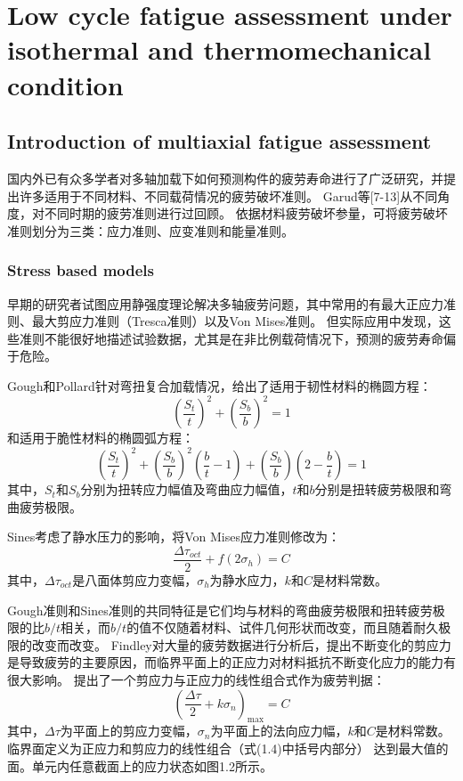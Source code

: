 ﻿\chapter{Low cycle fatigue assessment under isothermal and thermomechanical condition}



\section{Introduction of multiaxial fatigue assessment}
国内外已有众多学者对多轴加载下如何预测构件的疲劳寿命进行了广泛研究，并提出许多适用于不同材料、不同载荷情况的疲劳破坏准则。
Garud等[7-13]从不同角度，对不同时期的疲劳准则进行过回顾。
依据材料疲劳破坏参量，可将疲劳破坏准则划分为三类：应力准则、应变准则和能量准则。
\subsection{Stress based models}
早期的研究者试图应用静强度理论解决多轴疲劳问题，其中常用的有最大正应力准则、最大剪应力准则（Tresca准则）以及Von Mises准则。
但实际应用中发现，这些准则不能很好地描述试验数据，尤其是在非比例载荷情况下，预测的疲劳寿命偏于危险。

Gough和Pollard\cite{gough1935strength}\cite{gough1936properties}针对弯扭复合加载情况，给出了适用于韧性材料的椭圆方程：
\[{\left( {\frac{{{S_t}}}{t}} \right)^2} + {\left( {\frac{{{S_b}}}{b}} \right)^2} = 1\]
和适用于脆性材料的椭圆弧方程：
\[{\left( {\frac{{{S_t}}}{t}} \right)^2} + {\left( {\frac{{{S_b}}}{b}} \right)^2}\left( {\frac{b}{t} - 1} \right) + \left( {\frac{{{S_b}}}{b}} \right)\left( {2 - \frac{b}{t}} \right) = 1\]
其中，${S_t}$和${S_b}$分别为扭转应力幅值及弯曲应力幅值，$t$和$b$分别是扭转疲劳极限和弯曲疲劳极限。

Sines\cite{sines1959behavior}考虑了静水压力的影响，将Von Mises应力准则修改为：
\[\frac{{\Delta {\tau _{oct}}}}{2} + f\left( {2{\sigma _h}} \right) = C\]
其中，${\Delta {\tau _{oct}}}$是八面体剪应力变幅，${\sigma _h}$为静水应力，$k$和$C$是材料常数。

Gough准则和Sines准则的共同特征是它们均与材料的弯曲疲劳极限和扭转疲劳极限的比$b/t$相关，而$b/t$的值不仅随着材料、试件几何形状而改变，而且随着耐久极限的改变而改变。
Findley\cite{findley1953combined}\cite{findley1954modified}\cite{findley1956theory}\cite{findley1958theory}对大量的疲劳数据进行分析后，提出不断变化的剪应力是导致疲劳的主要原因，而临界平面上的正应力对材料抵抗不断变化应力的能力有很大影响。
提出了一个剪应力与正应力的线性组合式作为疲劳判据：
\[{\left( {\frac{{\Delta \tau }}{2} + k{\sigma _n}} \right)_{\max }} = C\]
其中，${\Delta \tau }$为平面上的剪应力变幅，${\sigma _n}$为平面上的法向应力幅，$k$和$C$是材料常数。
临界面定义为正应力和剪应力的线性组合（式(1.4)中括号内部分）
达到最大值的面。单元内任意截面上的应力状态如图1.2所示。

